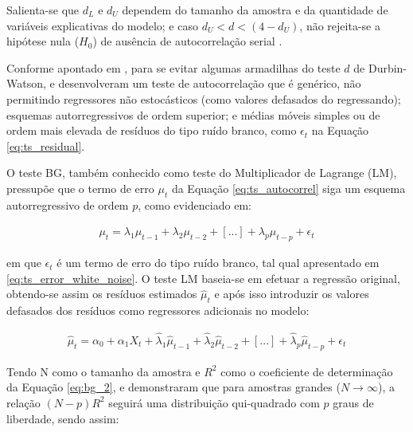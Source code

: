 Salienta-se que $d_{L}$ e $d_{U}$ dependem do tamanho da amostra e da quantidade de variáveis explicativas do modelo; e caso $d_{U} < d < (4 - d_{U})$, não rejeita-se a hipótese nula ($H_{0}$) de ausência de autocorrelação serial \cite{gujarati_ecn2011}.


Conforme apontado em , para se evitar algumas armadilhas do teste $d$ de Durbin-Watson,  e  desenvolveram um teste de autocorrelação que é genérico, não permitindo regressores não estocásticos (como valores defasados do regressando); esquemas autorregressivos de ordem superior; e médias móveis simples ou de ordem mais elevada de resíduos do tipo ruído branco, como $\epsilon_{t}$ na Equação \eqref{eq:ts_residual}.

O teste BG, também conhecido como teste do Multiplicador de Lagrange (LM), pressupõe que o termo de erro $\mu_{t}$ da Equação \eqref{eq:ts_autocorrel} siga um esquema autorregressivo de ordem $p$, como evidenciado em:

\begin{ceqn}
\begin{align} \label{eq:bg_1}
\mu_{t} = \lambda_{1} \mu_{t-1} + \lambda_{2} \mu_{t-2} + [...] + \lambda_{p} \mu_{t-p} + \epsilon_{t}
\end{align}
\end{ceqn} em que $\epsilon_{t}$ é um termo de erro do tipo ruído branco, tal qual apresentado em \eqref{eq:ts_error_white_noise}. O teste LM baseia-se em efetuar a regressão original, obtendo-se assim os resíduos estimados $\hat{\mu}_{t}$ e após isso introduzir os valores defasados dos resíduos como regressores adicionais no modelo:

\begin{ceqn}
\begin{align} \label{eq:bg_2}
\hat{\mu}_{t} = \alpha_{0} + \alpha_{1} X_{t} + \hat{\lambda}_{1} \hat{\mu}_{t-1} + \hat{\lambda}_{2} \hat{\mu}_{t-2} + [...] + \hat{\lambda}_{p} \hat{\mu}_{t-p} + \epsilon_{t}
\end{align}
\end{ceqn}

Tendo N como o tamanho da amostra e $R^2$ como o coeficiente de determinação da Equação \eqref{eq:bg_2},  e  demonstraram que para amostras grandes ($N \rightarrow \infty$), a relação $(N-p) R^2$ seguirá uma distribuição qui-quadrado com $p$ graus de liberdade, sendo assim:

